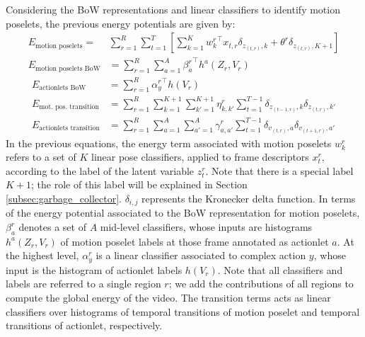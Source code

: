 Considering the BoW representations and linear classifiers to identify motion 
poselets, 
the previous energy potentials are given by:
{\small
\begin{align}
\label{eq:motionposelets}E_{\text{motion poselets}}  =  &\sum_{r=1}^R\sum_{t=1}^T  \left[ \sum_{k=1}^K {w^r_k}^\top 
x_{t,r}\delta_{z_{(t,r)},k} + \theta^r \delta_{z_{(t,r)},K+1}\right] \\
E_{\text{motion poselets BoW}} & = \sum_{r=1}^R \sum_{a=1}^A {\beta^r_{a}}^\top 
h^{a}(Z_r,V_r)
\end{align}
\begin{align}
\label{eq:actionlets_BoW} E_{\text{actionlets BoW}} &=\sum_{r=1}^R {\alpha^r_{y}}^\top h(V_r)  \\
E_{\text{mot. pos. transition}} & = 
\sum_{r=1}^R\sum_{k=1}^{K+1}\sum_{k'=1}^{K+1} \eta^r_{k,k'} 
\sum_{t=1}^{T-1} \delta_{z_{(t-1,r)},k}\delta_{z_{(t,r)},k'}\\ 
\label{eq:actionletstransition}
E_{\text{actionlets transition}} & =\sum_{r=1}^R\sum_{a=1}^A\sum_{a'=1}^A \gamma^r_{a,a'} 
\sum_{t=1}^{T-1} 
\delta_{v_{(t,r)},a}\delta_{v_{(t+1,r)},a'} 
\end{align}
}
In the previous equations, the energy term associated with motion poselets 
$w^r_k$ refers to a set of $K$ linear pose classifiers, applied to frame 
descriptors $x_t^r$, according to the label of the latent variable $z_t^r$. 
Note that there is a special label $K+1$; the role of this label will be 
explained in Section \ref{subsec:garbage_collector}. $\delta_{i,j}$ represents 
the Kronecker delta function. In terms of the energy potential associated to 
the BoW representation for motion poselets, $\beta_a^r$ denotes a set of $A$ 
mid-level classifiers, whose inputs are histograms $h^a(Z_r,V_r)$ of motion 
poselet labels at those frame annotated as actionlet $a$. At the highest level, 
$\alpha^r_{y}$ is a linear classifier  associated to complex action $y$, whose 
input is the histogram of actionlet labels $h(V_r)$. Note that all classifiers 
and labels are referred to a single region $r$; we add the contributions of all 
regions to compute the global energy of the video. The transition terms acts as 
linear classifiers over histograms of temporal transitions of motion poselet 
and temporal transitions of actionlet, respectively.

